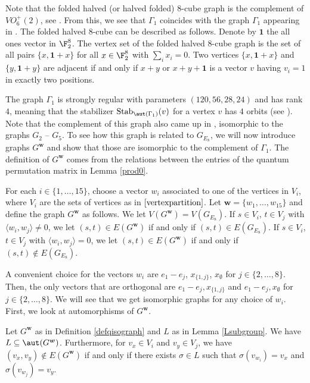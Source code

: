 Note that the folded halved (or halved folded) $8$-cube graph is the complement of $VO_6^+(2)$, see \cite[Section 10.26]{BVM}. From this, we see that $\Gamma_1$ coincides with the graph $\Gamma_1$ appearing in \cite{BIK}. The folded halved $8$-cube can be described as follows. Denote by $\mathbf{1}$ the all ones vector in $\F_2^8$. The vertex set of the folded halved $8$-cube graph is the set of all pairs $\{x,\mathbf{1}+x\}$ for all $x\in \F_2^8$ with $\sum_i x_i=0$. Two vertices $\{x,\mathbf{1}+x\}$ and $\{y,\mathbf{1}+y\}$ are adjacent if and only if $x+y$ or $x+y+\mathbf{1}$ is a vector $v$ having $v_i=1$ in exactly two positions. 


The graph $\Gamma_1$ is strongly regular with parameters $(120, 56, 28, 24)$ and has rank $4$, meaning that the stabilizer $\mathrm{Stab}_{\aut(\Gamma_1)}(v)$ for a vertex $v$ has $4$ orbits (see \cite{BIK}). Note that the complement of this graph also came up in \cite[Table 2.2]{MS}, isomorphic to the graphs $G_2$ -- $G_5$. To see how this graph is related to $G_{E_8}$, we will now introduce graphs $G^{\boldsymbol{w}}$ and show that those are isomorphic to the complement of $\Gamma_1$. The definition of $G^{\boldsymbol{w}}$ comes from the relations between the entries of the quantum permutation matrix in Lemma \ref{prod0}. 

\begin{defi}\label{defqisograph}
For each $i \in \{1,\dots, 15\}$, choose a vector $w_i$ associated to one of the vertices in $V_i$, where $V_i$ are the sets of vertices as in $\eqref{vertexpartition}$. Let $\boldsymbol{w}=\{w_1, \dots, w_{15}\}$ and define the graph $G^{\boldsymbol{w}}$ as follows. We let $V(G^{\boldsymbol{w}})=V(G_{E_8})$. If $s\in V_i$, $t\in V_j$ with $\langle w_i, w_j\rangle \neq 0$, we let $(s,t)\in E(G^{\boldsymbol{w}})$ if and only if $(s,t)\in E(G_{E_8})$. If $s\in V_i$, $t\in V_j$ with $\langle w_i, w_j\rangle = 0$, we let $(s,t)\in E(G^{\boldsymbol{w}})$ if and only if $(s,t)\notin E(G_{E_8})$. 
\end{defi}

A convenient choice for the vectors $w_i$ are $e_1-e_j$, $x_{\{1,j\}}$, $x_{\emptyset}$ for $j \in \{2,\dots, 8\}$. Then, the only vectors that are orthogonal are $e_1-e_j, x_{\{1,j\}}$ and $e_1-e_j, x_{\emptyset}$ for $j \in \{2,\dots, 8\}$. We will see that we get isomorphic graphs for any choice of $w_i$. First, we look at automorphisms of $G^{\boldsymbol{w}}$. 

\begin{lemm}\label{autsG'}
Let $G^{\boldsymbol{w}}$ as in Definition \ref{defqisograph} and $L$ as in Lemma \ref{Lsubgroup}. We have $L \subseteq \aut(G^{\boldsymbol{w}})$. Furthermore, for $v_x \in V_i$ and $v_y \in V_j$, we have $(v_x,v_y) \notin E(G^{\boldsymbol{w}})$ if and only if there exists $\sigma\in L$ such that $\sigma(v_{w_i})=v_x$ and $\sigma(v_{w_j})=v_y$.
\end{lemm}

